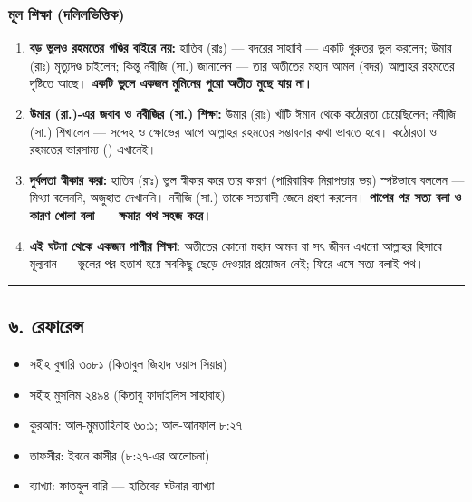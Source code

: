 \subsubsection*{মূল শিক্ষা (দলিলভিত্তিক)}

\begin{enumerate}
\item \textbf{বড় ভুলও রহমতের গণ্ডির বাইরে নয়:} হাতিব (রাঃ) — বদরের সাহাবি — একটি গুরুতর ভুল করলেন; উমার (রাঃ) মৃত্যুদণ্ড চাইলেন; কিন্তু নবীজি (সা.) জানালেন — তার অতীতের মহান আমল (বদর) আল্লাহর রহমতের দৃষ্টিতে আছে। \textbf{একটি ভুলে একজন মুমিনের পুরো অতীত মুছে যায় না।}
\item \textbf{উমার (রা.)-এর জবাব ও নবীজির (সা.) শিক্ষা:} উমার (রাঃ) খাঁটি ঈমান থেকে কঠোরতা চেয়েছিলেন; নবীজি (সা.) শিখালেন — সন্দেহ ও ক্ষোভের আগে আল্লাহর রহমতের সম্ভাবনার কথা ভাবতে হবে। কঠোরতা ও রহমতের ভারসাম্য () এখানেই।
\item \textbf{দুর্বলতা স্বীকার করা:} হাতিব (রাঃ) ভুল স্বীকার করে তার কারণ (পারিবারিক নিরাপত্তার ভয়) স্পষ্টভাবে বললেন — মিথ্যা বলেননি, অজুহাত দেখাননি। নবীজি (সা.) তাকে সত্যবাদী জেনে গ্রহণ করলেন। \textbf{পাপের পর সত্য বলা ও কারণ খোলা বলা — ক্ষমার পথ সহজ করে।}
\item \textbf{এই ঘটনা থেকে একজন পাপীর শিক্ষা:} অতীতের কোনো মহান আমল বা সৎ জীবন এখনো আল্লাহর হিসাবে মূল্যবান — ভুলের পর হতাশ হয়ে সবকিছু ছেড়ে দেওয়ার প্রয়োজন নেই; ফিরে এসে সত্য বলাই পথ।
\end{enumerate}
\medskip\hrule\medskip

\subsection*{৬. রেফারেন্স}

\begin{itemize}
\item সহীহ বুখারি ৩০৮১ (কিতাবুল জিহাদ ওয়াস সিয়ার)
\item সহীহ মুসলিম ২৪৯৪ (কিতাবু ফাদাইলিস সাহাবাহ)
\item কুরআন: আল-মুমতাহিনাহ ৬০:১; আল-আনফাল ৮:২৭
\item তাফসীর: ইবনে কাসীর (৮:২৭-এর আলোচনা)
\item ব্যাখ্যা: ফাতহুল বারি — হাতিবের ঘটনার ব্যাখ্যা
\end{itemize}


